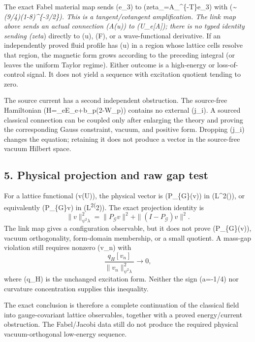 The exact Fabel material map sends (e\_3) to
(zeta\_\tau=A\_\tau\^{}\{-\mathsf T\}e\_3) with
(\textbar{}\zeta\emph{\tau\textbar{}\sim(9/4)(1-8\tau)\^{}\{-3/2\}).
This is a tangent/cotangent amplification. The link map above sends an
actual connection (\mathcal A(u)) to (U\_e{[}\mathcal A{]}); there is no
typed identity sending (zeta}\tau) directly to (u), (F), or a
wave-functional derivative. If an independently proved fluid profile has
(\textbar{}\nabla\times u\textbar{}\to\infty) in a region whose lattice
cells resolve that region, the magnetic form grows according to the
preceding integral (or leaves the uniform Taylor regime). Either outcome
is a high-energy or loss-of-control signal. It does not yield a sequence
with excitation quotient tending to zero.

The source current has a second independent obstruction. The source-free
Hamiltonian (H=\kappa\sum\_eE\_e+b\sum\_p(2-W\_p)) contains no external
(j\_i). A sourced classical connection can be coupled only after
enlarging the theory and proving the corresponding Gauss constraint,
vacuum, and positive form. Dropping (j\_i) changes the equation;
retaining it does not produce a vector in the source-free vacuum Hilbert
space.

\subsection{5. Physical projection and raw gap
test}\label{fabel-current-to-lattice-audit-md-physical-projection-and-raw-gap-test}

For a lattice functional (v(U)), the physical vector is
(P\_\{\mathcal G\}(v\psi)) in (L\^{}2(\lambda)), or equivalently
(P\_\{\mathcal G\}v) in (L\textsuperscript{2(\psi}2\lambda)). The exact
projection identity is \[
\|v\|_{\psi^2\lambda}^2=\|P_{\mathcal G}v\|^2+\|(I-P_{\mathcal G})v\|^2.
\] The link map gives a configuration observable, but it does not prove
(P\_\{\mathcal G\}(v\psi)), vacuum orthogonality, form-domain
membership, or a small quotient. A mass-gap violation still requires
nonzero (v\_n\perp\psi) with \[
\frac{q_H[v_n]}{\|v_n\|^2_{\psi^2\lambda}}\to0,
\] where (q\_H) is the unchanged excitation form. Neither the sign
(a=-1/4) nor curvature concentration supplies this inequality.

The exact conclusion is therefore a complete continuation of the
classical field into gauge-covariant lattice observables, together with
a proved energy/current obstruction. The Fabel/Jacobi data still do not
produce the required physical vacuum-orthogonal low-energy sequence.
